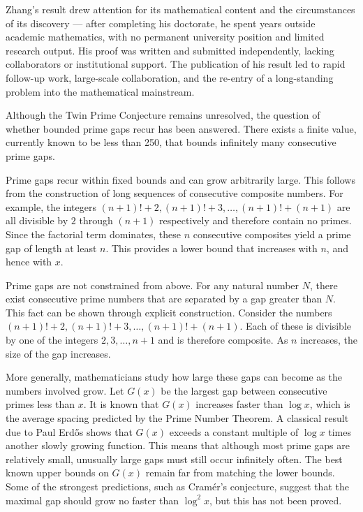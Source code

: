 Zhang's result drew attention for its mathematical content and the circumstances of its discovery — after completing his doctorate, he spent years outside academic mathematics, with no permanent university position and limited research output. His proof was written and submitted independently, lacking collaborators or institutional support. The publication of his result led to rapid follow-up work, large-scale collaboration, and the re-entry of a long-standing problem into the mathematical mainstream.

Although the Twin Prime Conjecture remains unresolved, the question of whether bounded prime gaps recur has been answered. There exists a finite value, currently known to be less than 250, that bounds infinitely many consecutive prime gaps.

Prime gaps recur within fixed bounds and can grow arbitrarily large. This follows from the construction of long sequences of consecutive composite numbers. For example, the integers $(n+1)! + 2,  (n+1)! + 3,  \dots,  (n+1)! + (n+1)$ are all divisible by $2$ through $(n+1)$ respectively and therefore contain no primes. Since the factorial term dominates, these $n$ consecutive composites yield a prime gap of length at least $n$. This provides a lower bound that increases with $n$, and hence with $x$.

Prime gaps are not constrained from above. For any natural number $N$, there exist consecutive prime numbers that are separated by a gap greater than $N$. This fact can be shown through explicit construction. Consider the numbers $(n+1)! + 2,  (n+1)! + 3,  \dots,  (n+1)! + (n+1).$ Each of these is divisible by one of the integers $2, 3, \dots, n+1$ and is therefore composite. As $n$ increases, the size of the gap increases.

More generally, mathematicians study how large these gaps can become as the numbers involved grow. Let $G(x)$ be the largest gap between consecutive primes less than $x$. It is known that $G(x)$ increases faster than $\log x$, which is the average spacing predicted by the Prime Number Theorem. A classical result due to Paul Erdős shows that $G(x)$ exceeds a constant multiple of $\log x$ times another slowly growing function. This means that although most prime gaps are relatively small, unusually large gaps must still occur infinitely often. The best known upper bounds on $G(x)$ remain far from matching the lower bounds. Some of the strongest predictions, such as Cramér's conjecture, suggest that the maximal gap should grow no faster than $\log^2 x$, but this has not been proved.

